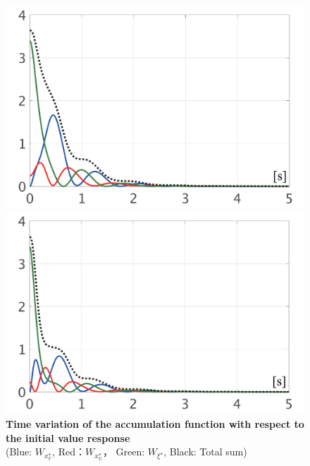 \documentclass[graybox, envcountchap]{svmult}
\begin{document}
\begin{figure}[t]
  \centering
  {
  \begin{minipage}{0.49\linewidth}
    \centering
    \includegraphics[width = 1.0\linewidth]{figs/Wnlin1}
  \end{minipage}
  \begin{minipage}{0.49\linewidth}
    \centering
    \includegraphics[width = 1.0\linewidth]{figs/Wnlin2}
  \end{minipage}
  }
  \medskip
  \caption{\textbf{Time variation of the accumulation function with respect to the initial value response}
  \\  \centering(Blue: $W_{x^{\star}_{\mathds{F}}}$, Red：$W_{x^{\star}_{\mathds{G}}}$，
  Green: $W_{\xi^{\star}}$, Black: Total sum)}
  \label{fig:LyapWnlin}
\medskip
\end{figure}
\end{document}
